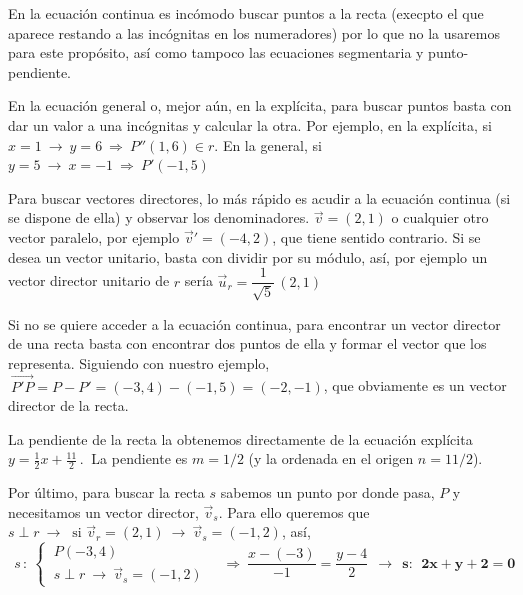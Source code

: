 \begin{miejemplo}
\vspace{2mm} En la ecuación continua es incómodo buscar puntos a la recta (execpto el que aparece restando a las incógnitas en los numeradores) por lo que no la usaremos para este propósito, así como tampoco las ecuaciones segmentaria y punto-pendiente.

\vspace{2mm} En la ecuación general o, mejor aún, en la explícita, para buscar puntos basta con dar un valor a una incógnitas y calcular la otra. Por ejemplo, en la explícita, si $x=1\ \to \ y=6 \ \Rightarrow \ P''(1,6)\in r$. En la general, si $y=5 \ \to \ x=-1 \ \Rightarrow \ P'(-1,5)$

\vspace{2mm} Para buscar vectores directores, lo más rápido es acudir a la ecuación continua (si se dispone de ella) y observar los denominadores. $\vec v=(2,1)$ o cualquier otro vector paralelo, por ejemplo $\vec v'=(-4,2)$, que tiene sentido contrario. Si se desea un vector unitario, basta con dividir por su módulo, así, por ejemplo un vector director unitario de $r$ sería $\vec u_r=\dfrac{1}{\sqrt{5}} \, (2,1)$

\vspace{2mm} Si no se quiere acceder a la ecuación continua, para encontrar un vector director de una recta basta con encontrar dos puntos de ella y formar el vector que los representa. Siguiendo con nuestro ejemplo, $ \ \overrightarrow{P'P}=P-P'=(-3,4)-(-1,5)=(-2,-1)$, que obviamente es un vector director de la recta.

\vspace{2mm} La pendiente de la recta la obtenemos directamente de la ecuación explícita $y=\frac 1 2 x +\frac{11}2\, .  \ $ La pendiente es $m=1/2$ (y la ordenada en el origen $n=11/2$).

\vspace{2mm} Por último, para buscar la recta $s$ sabemos un punto por donde pasa, $P$ y necesitamos un vector director, $\vec v_s$. Para ello queremos que $s\perp r \ \to \ \text{ si } \vec v_r=(2,1) \ \to \ \vec v_s=(-1,2)$, así,$\ \ s\, : \ \begin{cases} \ P(-3,4) \\ \ s \perp r \ \to \ \vec v_s=(-1,2) \end{cases} \quad \Rightarrow \ \dfrac{x-(-3)}{-1}=\dfrac{y-4}{2} \ \ \to \ \ \boldsymbol {s:\ \ 2x+y+2=0}$
\end{miejemplo}


